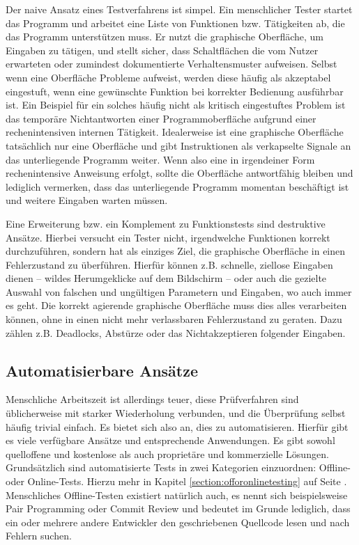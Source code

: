 Der naive Ansatz eines Testverfahrens ist simpel. Ein menschlicher Tester startet
das Programm und arbeitet eine Liste von Funktionen bzw. Tätigkeiten ab, die das
Programm unterstützen muss. Er nutzt die graphische Oberfläche, um Eingaben zu tätigen,
und stellt sicher, dass Schaltflächen die vom Nutzer erwarteten oder zumindest
dokumentierte Verhaltensmuster aufweisen. Selbst wenn eine Oberfläche Probleme aufweist,
werden diese häufig als akzeptabel eingestuft, wenn eine gewünschte Funktion
bei korrekter Bedienung ausführbar ist. Ein Beispiel für ein solches häufig nicht als kritisch 
eingestuftes Problem ist das temporäre Nichtantworten einer Programmoberfläche
aufgrund einer rechenintensiven internen Tätigkeit. Idealerweise ist eine
graphische Oberfläche tatsächlich nur eine Oberfläche und gibt Instruktionen als
verkapselte Signale an das unterliegende Programm weiter. Wenn also eine
in irgendeiner Form rechenintensive Anweisung erfolgt, sollte die Oberfläche
antwortfähig bleiben und lediglich vermerken, dass das unterliegende Programm
momentan beschäftigt ist und weitere Eingaben warten müssen.

Eine Erweiterung bzw. ein Komplement zu Funktionstests sind destruktive Ansätze.
Hierbei versucht ein Tester nicht, irgendwelche Funktionen korrekt durchzuführen,
sondern hat als einziges Ziel, die graphische Oberfläche in einen Fehlerzustand
zu überführen. Hierfür können z.B. schnelle, ziellose Eingaben dienen -- wildes Herumgeklicke
auf dem Bildschirm -- oder auch die gezielte Auswahl von falschen und ungültigen
Parametern und Eingaben, wo auch immer es geht. Die korrekt agierende
graphische Oberfläche muss dies alles verarbeiten können, ohne in einen nicht
mehr verlassbaren Fehlerzustand zu geraten. Dazu zählen z.B. Deadlocks,
Abstürze oder das Nichtakzeptieren folgender Eingaben.

\subsection{Automatisierbare Ansätze}

Menschliche Arbeitszeit ist allerdings teuer, diese Prüfverfahren sind üblicherweise
mit starker Wiederholung verbunden, und die Überprüfung selbst häufig trivial einfach.
Es bietet sich also an, dies zu automatisieren. Hierfür gibt es viele verfügbare Ansätze
und entsprechende Anwendungen. Es gibt sowohl quelloffene und kostenlose als auch proprietäre
und kommerzielle Lösungen. Grundsätzlich sind automatisierte Tests in zwei Kategorien einzuordnen:
Offline- oder Online-Tests. Hierzu mehr in Kapitel \ref{section:offoronlinetesting} auf Seite
\pageref{section:offoronlinetesting}. Menschliches Offline-Testen existiert natürlich auch,
es nennt sich beispielsweise \glqq{}Pair Programming\grqq{} oder \glqq{}Commit Review\grqq{}
und bedeutet im Grunde lediglich, dass ein oder mehrere andere Entwickler den geschriebenen Quellcode
lesen und nach Fehlern suchen.

